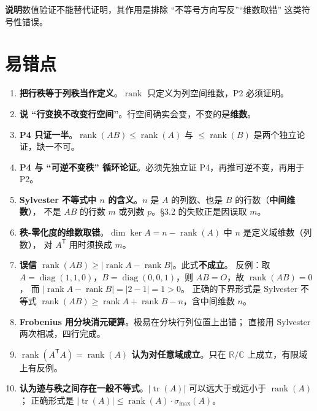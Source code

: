 \documentclass[11pt]{ctexart}
\newcommand{\rank}{\operatorname{rank}}
\newcommand{\tr}{\operatorname{tr}}
\newcommand{\C}{\mathbb{C}}
\newcommand{\R}{\mathbb{R}}
\newcommand{\T}{^{\mathsf T}}
\begin{document}
\textbf{说明}\quad 数值验证不能替代证明，其作用是排除 ``不等号方向写反''``维数取错'' 这类符号性错误。

\section{易错点}
\begin{enumerate}
\item \textbf{把行秩等于列秩当作定义}。$\rank$ 只定义为列空间维数，P2 必须证明。

\item \textbf{说 ``行变换不改变行空间''}。行空间确实会变，不变的是\textbf{维数}。

\item \textbf{P4 只证一半}。$\rank(AB)\le\rank(A)$ 与 $\le\rank(B)$ 是两个独立论证，缺一不可。

\item \textbf{P4 与 ``可逆不变秩'' 循环论证}。必须先独立证 P4，再推可逆不变，再用于 P2。

\item \textbf{Sylvester 不等式中 $n$ 的含义}。$n$ 是 $A$ 的列数、也是 $B$ 的行数（\textbf{中间维数}），
不是 $AB$ 的行数 $m$ 或列数 $p$。\S3.2 的失败正是因误取 $m$。

\item \textbf{秩-零化度的维数取错}。$\dim\ker A=n-\rank(A)$ 中 $n$ 是定义域维数（列数），
对 $A\T$ 用时须换成 $m$。

\item \textbf{误信 $\rank(AB)\ge\lvert\rank A-\rank B\rvert$}。此式\textbf{不成立}。
反例：取 $A=\operatorname{diag}(1,1,0)$，$B=\operatorname{diag}(0,0,1)$，则 $AB=O$，故 $\rank(AB)=0$，
而 $\lvert\rank A-\rank B\rvert=\lvert 2-1\rvert=1>0$。
正确的下界形式是 Sylvester 不等式 $\rank(AB)\ge\rank A+\rank B-n$，含中间维数 $n$。

\item \textbf{Frobenius 用分块消元硬算}。极易在分块行列位置上出错；
直接用 Sylvester 两次相减，四行完成。

\item \textbf{$\rank(A\T A)=\rank(A)$ 认为对任意域成立}。只在 $\R/\C$ 上成立，有限域上有反例。

\item \textbf{认为迹与秩之间存在一般不等式}。$\lvert\tr(A)\rvert$ 可以远大于或远小于 $\rank(A)$；
正确形式是 $\lvert\tr(A)\rvert\le\rank(A)\cdot\sigma_{\max}(A)$。
\end{enumerate}
\end{document}
